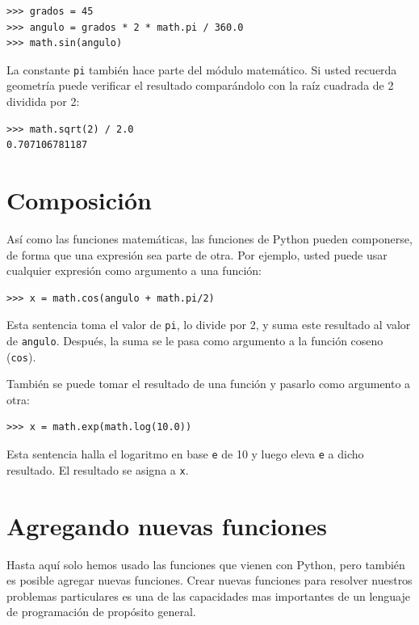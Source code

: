 \begin{lstlisting}
>>> grados = 45
>>> angulo = grados * 2 * math.pi / 360.0
>>> math.sin(angulo)
\end{lstlisting}
 La constante \texttt{pi} también hace parte del módulo matemático.
Si usted recuerda geometría puede verificar el resultado comparándolo
con la raíz cuadrada de 2 dividida por 2:

\begin{lstlisting}
>>> math.sqrt(2) / 2.0
0.707106781187
\end{lstlisting}

\section{Composición}

 

Así como las funciones matemáticas, las funciones de Python pueden
componerse, de forma que una expresión sea parte de otra. Por ejemplo,
usted puede usar cualquier expresión como argumento a una función:

\begin{lstlisting}
>>> x = math.cos(angulo + math.pi/2)
\end{lstlisting}
Esta sentencia toma el valor de \texttt{pi}, lo divide por 2, y suma
este resultado al valor de \texttt{angulo}. Después, la suma se le
pasa como argumento a la función coseno (\texttt{cos}).

También se puede tomar el resultado de una función y pasarlo como
argumento a otra:
\begin{lstlisting}
>>> x = math.exp(math.log(10.0))
\end{lstlisting}
Esta sentencia halla el logaritmo en base \texttt{e} de 10 y luego
eleva \texttt{e} a dicho resultado. El resultado se asigna a \texttt{x}.

\section{Agregando nuevas funciones}

Hasta aquí solo hemos usado las funciones que vienen con Python, pero
también es posible agregar nuevas funciones. Crear nuevas funciones
para resolver nuestros problemas particulares es una de las capacidades
mas importantes de un lenguaje de programación de propósito general.


